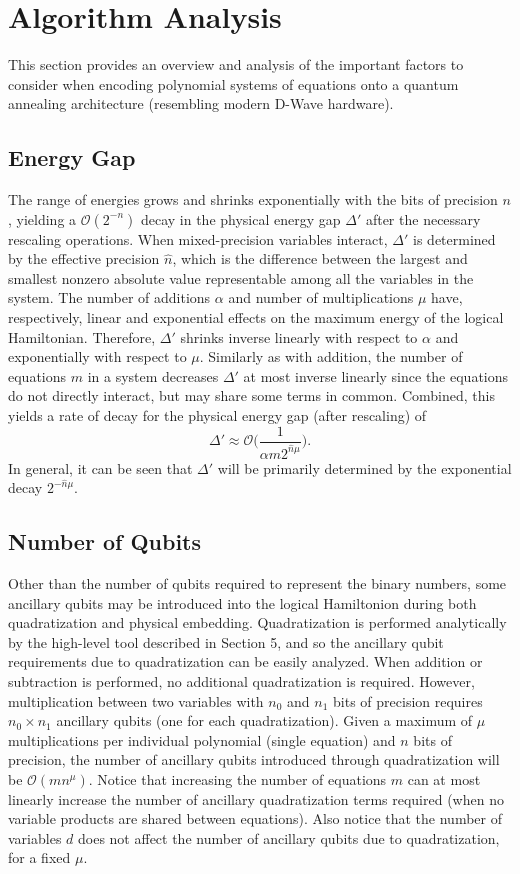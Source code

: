 \section{Algorithm Analysis}

This section provides an overview and analysis of the important factors to consider when encoding polynomial systems of equations onto a quantum annealing architecture (resembling modern D-Wave hardware).

\subsection{Energy Gap}

The range of energies grows and shrinks exponentially with the bits of precision $n$, yielding a $\mathcal{O}(2^{-n})$ decay in the physical energy gap $\Delta'$ after the necessary rescaling operations.
When mixed-precision variables interact, $\Delta'$ is determined by the effective precision $\hat n$, which is the difference between the largest and smallest nonzero absolute value representable among all the variables in the system.
The number of additions $\alpha$ and number of multiplications $\mu$ have, respectively, linear and exponential effects on the maximum energy of the logical Hamiltonian.
Therefore, $\Delta'$ shrinks inverse linearly with respect to $\alpha$ and exponentially with respect to $\mu$.
Similarly as with addition, the number of equations $m$ in a system decreases $\Delta'$ at most inverse linearly since the equations do not directly interact, but may share some terms in common.
Combined, this yields a rate of decay for the physical energy gap (after rescaling) of
$$\Delta' \approx \mathcal{O}\bigg(\frac{1}{\alpha m 2^{\hat n \mu}}\bigg).$$
In general, it can be seen that $\Delta'$ will be primarily determined by the exponential decay $2^{-{\hat n}\mu}$.

\subsection{Number of Qubits}

Other than the number of qubits required to represent the binary numbers, some ancillary qubits may be introduced into the logical Hamiltonion during both quadratization and physical embedding.
Quadratization is performed analytically by the high-level tool described in Section 5, and so the ancillary qubit requirements due to quadratization can be easily analyzed.
When addition or subtraction is performed, no additional quadratization is required.
However, multiplication between two variables with $n_0$ and $n_1$ bits of precision requires $n_0 \times n_1$ ancillary qubits (one for each quadratization).
Given a maximum of $\mu$ multiplications per individual polynomial (single equation) and $n$ bits of precision, the number of ancillary qubits introduced through quadratization will be $\mathcal{O}(m n^\mu)$.
Notice that increasing the number of equations $m$ can at most linearly increase the number of ancillary quadratization terms required (when no variable products are shared between equations).
Also notice that the number of variables $d$ does not affect the number of ancillary qubits due to quadratization, for a fixed $\mu$.

